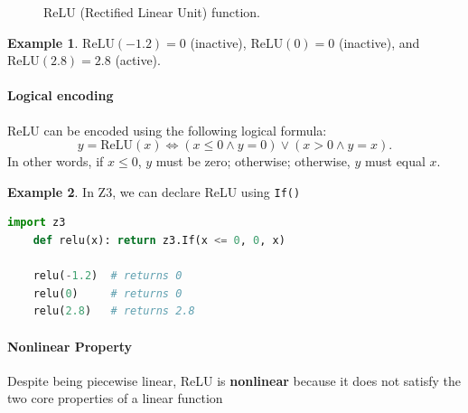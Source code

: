 \documentclass[oneside,11pt,dvipsnames]{book}
\numberwithin{equation}{section}
\theoremstyle{definition}
\newtheorem{example}{Example}[section]
\theoremstyle{remark}
\newcommand{\relu}[1]{\mathrm{ReLU}\left(#1\right)}
\begin{document}
\begin{figure}[h]
    \centering
    \caption{ReLU (Rectified Linear Unit) function.}\label{fig:relu}
\end{figure}

\begin{example}
$\relu{-1.2} = 0$ (inactive), $\relu{0} = 0$ (inactive), and $\relu{2.8} = 2.8$ (active).
\end{example}


\paragraph{Logical encoding} ReLU can be encoded using the following logical formula:
\[y = \relu{x} \iff (x \leq 0 \land y = 0) \lor (x > 0 \land y = x).\]
In other words, if \(x \le 0\), \(y\) must be zero; otherwise; otherwise, \(y\) must equal \(x\).

\begin{example}
In Z3, we can declare ReLU using \texttt{If()}
\begin{lstlisting}[language=python]
    import z3
    def relu(x): return z3.If(x <= 0, 0, x)

    relu(-1.2)  # returns 0
    relu(0)     # returns 0
    relu(2.8)   # returns 2.8
\end{lstlisting}
\end{example}
\paragraph{Nonlinear Property} Despite being piecewise linear, ReLU is \textbf{nonlinear} because it does not satisfy the two core properties of a linear function
\end{document}
